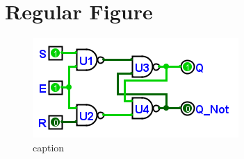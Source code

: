 \section{Regular Figure}
\begin{figure}[H]
	\centering
	\includegraphics[width=\maxwidth{.95\linewidth}]{gfx/09_01}
	\caption{caption}
	\label{fig:09_01}
\end{figure}

